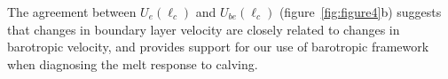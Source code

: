 \documentclass[draft]{agujournal2019}
\begin{document}
The agreement between $U_e(\ell_c)$ and $U_{be}(\ell_c)$ (figure~\ref{fig:figure4}b) suggests that changes in boundary layer velocity are closely related to changes in barotropic velocity, and provides support for our use of barotropic framework when diagnosing the melt response to calving.  %


\end{document}
